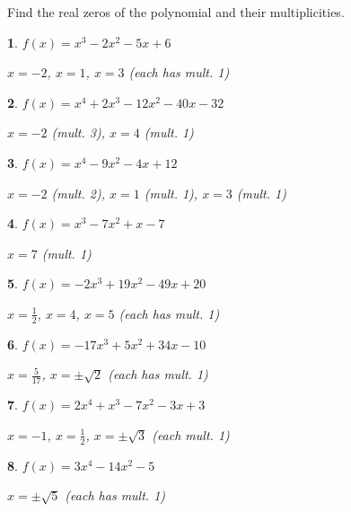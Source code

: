 \documentclass{amsbook}
\newtheorem{exc}{}
\newenvironment{ex}{\begin{exc}\normalfont}{\end{exc}}
\numberwithin{section}{chapter}
\numberwithin{equation}{chapter}
\begin{document}
Find the real zeros of the polynomial and their multiplicities.

\begin{multicols}{2}

\begin{ex}
	$f(x) = x^{3} - 2x^{2} - 5x + 6$
	\begin{sol}
		$x = -2$, $x = 1$, $x = 3$ (each has mult. 1)
	\end{sol}
\end{ex}


\begin{ex}
	$f(x) = x^{4} + 2x^{3} - 12x^{2} - 40x - 32$
	\begin{sol}
		$x = -2$ (mult. 3), $x = 4$ (mult. 1)
	\end{sol}
\end{ex}


\begin{ex}
	 $f(x) = x^{4} - 9x^{2} - 4x + 12$
	\begin{sol}
		 $x = -2$ (mult. 2), $x = 1$ (mult. 1), $x = 3$ (mult. 1)
	\end{sol}
\end{ex}

\begin{ex}
	 $f(x) = x^{3} - 7x^{2} + x - 7$
	\begin{sol}
		$x = 7$ (mult. 1)
	\end{sol}
\end{ex}


\begin{ex}
	$f(x) = -2x^{3} + 19x^{2} - 49x + 20$
	\begin{sol}
		 $x = \frac{1}{2}$, $x = 4$, $x = 5$ (each has mult. 1)
	\end{sol}
\end{ex}


\begin{ex}
	$f(x) = -17x^{3} + 5x^{2} + 34x - 10$
	\begin{sol}
		$x = \frac{5}{17}$, $x = \pm \sqrt{2}$ (each has mult. 1)
	\end{sol}
\end{ex}


\begin{ex}
	$f(x) = 2x^4+x^3-7x^2-3x+3$
	\begin{sol}
		 $x = -1$, $x = \frac{1}{2}$, $x=\pm \sqrt{3}$ (each mult. 1)
	\end{sol}
\end{ex}


\begin{ex}
	$f(x) = 3x^4-14x^2-5$
	\begin{sol}
		$x = \pm \sqrt{5}$ (each has mult. 1)
	\end{sol}
\end{ex}

\end{multicols}
\end{document}

